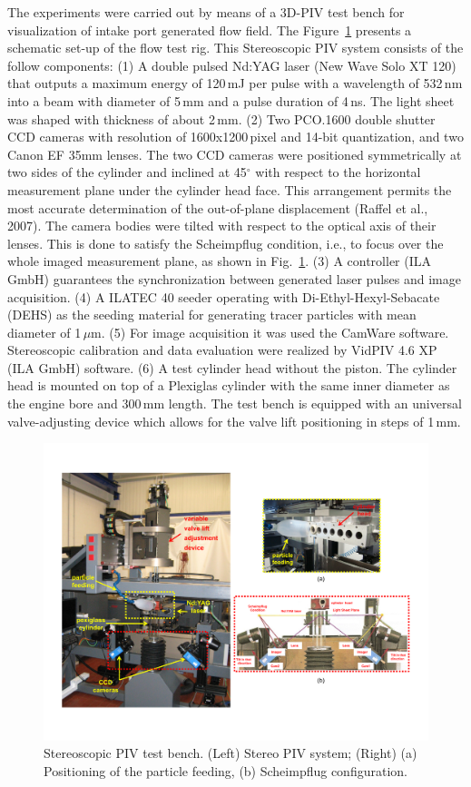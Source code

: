 \documentclass[10pt,fleqn,a4paper]{article}
\begin{document}
The experiments were carried out by means of a 3D-PIV test bench for visualization of intake port generated flow field. The Figure~\ref{fig: bench} presents a schematic set-up of the flow test rig. This Stereoscopic PIV system consists of the follow components: (1) A double pulsed Nd:YAG laser (New Wave Solo XT 120) that outputs a maximum energy of 120\,mJ per pulse with a wavelength of 532\,nm into a beam with diameter of 5\,mm and a pulse duration of 4\,ns. The light sheet was shaped with thickness of about 2\,mm. (2) Two PCO.1600 double shutter CCD cameras with resolution of 1600x1200\,pixel and 14-bit quantization, and two Canon EF 35mm lenses. The two CCD cameras were positioned symmetrically at two sides of the cylinder and inclined at 45$^{\circ}$ with respect to the horizontal measurement plane under the cylinder head face. This arrangement permits the most accurate determination of the out-of-plane displacement (Raffel et al., 2007). The camera bodies were tilted with respect to the optical axis of their lenses. This is done to satisfy the Scheimpflug condition, i.e., to focus over the whole imaged measurement plane, as shown in Fig.~\ref{fig: bench}. (3) A controller (ILA GmbH) guarantees the synchronization between generated laser pulses and image acquisition. (4) A ILATEC 40 seeder operating with Di-Ethyl-Hexyl-Sebacate (DEHS) as the seeding material for generating tracer particles with mean diameter of 1\,$\mu$m. (5) For image acquisition it was used the CamWare software. Stereoscopic calibration and data evaluation were realized by VidPIV 4.6 XP (ILA GmbH) software. (6) A test cylinder head without the piston. The cylinder head is mounted on top of a Plexiglas cylinder with the same inner diameter as the engine bore and 300\,mm length. The test bench is equipped with an universal valve-adjusting device which allows for the valve lift positioning in steps of 1\,mm. %

\begin{figure}[h]
 \centering
 \includegraphics[width=1\textwidth]{./imgs/bench.pdf}
 \caption{Stereoscopic PIV test bench. (Left) Stereo PIV system; (Right) (a) Positioning of the particle feeding, (b) Scheimpflug configuration.}
 \label{fig: bench}
\end{figure}
\end{document}
